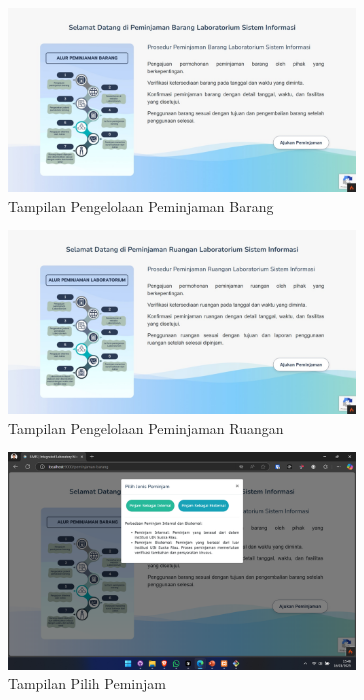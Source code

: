 \begin{figure}
	\centering
	\includegraphics[width=0.82\textwidth]{konten/gambar/perbaikan/peminjaman-barang.jpeg}
	\caption{Tampilan Pengelolaan Peminjaman Barang}
	\label{fig:peminjaman-barang}
\end{figure}

\begin{figure}
	\centering
	\includegraphics[width=0.82\textwidth]{konten/gambar/perbaikan/peminjaman-ruangan.jpeg}
	\caption{Tampilan Pengelolaan Peminjaman Ruangan}
	\label{fig:peminjaman-ruangan}
\end{figure}

\begin{figure}
	\centering
	\includegraphics[width=0.82\textwidth]{konten/gambar/perbaikan/pilih-peminjam.png}
	\caption{Tampilan Pilih Peminjam}
	\label{fig:pilih-peminjam}
\end{figure}

